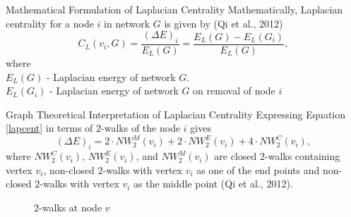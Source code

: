 \documentclass{beamer}
\begin{document}
\begin{frame}{Mathematical Formulation of Laplacian Centrality}
Mathematically, Laplacian centrality for a node $i$ in network $G$ is given by (Qi et al., 2012) \\
\vspace{0.2cm}
\begin{equation}
C_L(v_i,G) = \frac{(\Delta E)_i}{E_L(G)} = \frac{E_L(G) - E_L(G_i)}{E_L(G)},
\label{lapcent}
\end{equation}
where \\
$E_L(G)$ - Laplacian energy of network $G$.\\
$E_L(G_i)$ - Laplacian energy of network $G$ on removal of node $i$
\end{frame}

\begin{frame}{Graph Theoretical Interpretation of Laplacian Centrality}
Expressing Equation \ref*{lapcent} in terms of $2$-walks of the node $i$ gives
\begin{equation}
(\Delta E)_i = 2\cdot NW_{2} ^M(v_i) + 2 \cdot NW_{2} ^E(v_i) + 4 \cdot NW_{2} ^C(v_i), 
\end{equation}
\vspace{0.3cm}
where 
$NW_{2} ^C(v_i)$, $NW_{2} ^E(v_i)$, and $NW_{2} ^M(v_i)$ are closed $2$-walks containing vertex $v_i$, non-closed $2$-walks with vertex $v_i$ as one of the end points and non-closed $2$-walks with vertex $v_i$ as the middle point
(Qi et al., 2012).

\begin{figure}[!h]
	\centering
	\caption{$2$-walks at node $v$}
\end{figure}

\end{frame}
\end{document}
